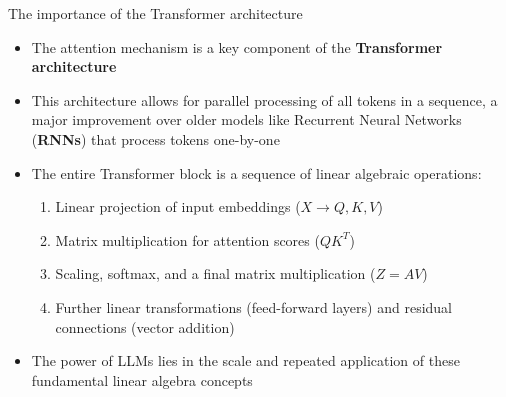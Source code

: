 \documentclass[aspectratio=169]{beamer}\usepackage[]{graphicx}\usepackage[]{xcolor}
\makeatletter
\newcommand{\defword}[1]{\textbf{\textcolor{beamer@blendedblue}{#1}}}
\makeatother
\begin{document}
\begin{frame}{The importance of the Transformer architecture}
\begin{itemize}
    \item The attention mechanism is a key component of the \defword{Transformer architecture}
    \vfill
    \item This architecture allows for parallel processing of all tokens in a sequence, a major improvement over older models like Recurrent Neural Networks (\textbf{RNNs}) that process tokens one-by-one
    \vfill
    \item The entire Transformer block is a sequence of linear algebraic operations:
    \begin{enumerate}
        \item Linear projection of input embeddings ($X \to Q, K, V$)
        \vfill
        \item Matrix multiplication for attention scores ($QK^T$)
        \vfill
        \item Scaling, softmax, and a final matrix multiplication ($Z=AV$)
        \vfill
        \item Further linear transformations (feed-forward layers) and residual connections (vector addition)
    \end{enumerate}
    \vfill
    \item The power of LLMs lies in the scale and repeated application of these fundamental linear algebra concepts
\end{itemize}
\end{frame}
\end{document}
